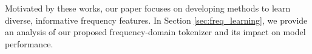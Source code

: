 Motivated by these works, our paper focuses on developing methods to learn diverse, informative frequency features. 
In Section \ref{sec:freq_learning}, we provide an analysis of our proposed frequency-domain tokenizer and its impact on model performance.

